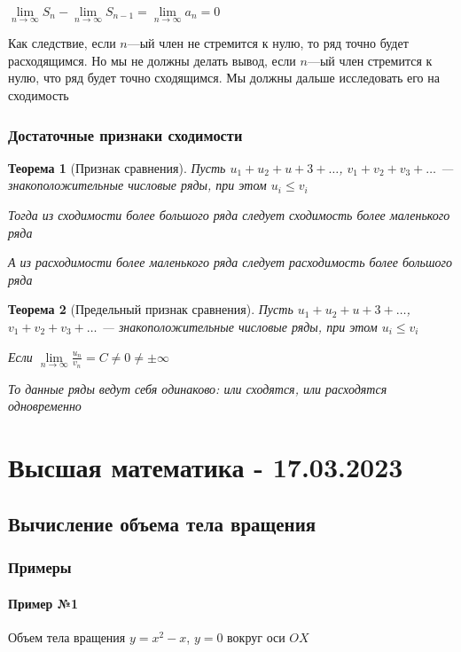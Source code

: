 \documentclass{article}
\newtheorem{theorem}{Теорема}
\begin{document}
$\lim\limits_{n \to \infty} S_{n} - \lim\limits_{n \to \infty} S_{n - 1} = \lim\limits_{n \to \infty} a_n = 0$

\hfill

Как следствие, если $n$—ый член не стремится к нулю, то ряд точно будет расходящимся. Но мы не должны делать вывод, если $n$—ый член стремится к нулю, что ряд будет точно сходящимся. Мы должны дальше исследовать его на сходимость

\subsubsection{Достаточные признаки сходимости}

\begin{theorem}[Признак сравнения]
    Пусть $u_1 + u_2 + u+3 + \dots$, $v_1 + v_2 + v_3 + \dots$ — знакоположительные числовые ряды, при этом $u_{i} \le v_{i}$

    Тогда из сходимости более большого ряда следует сходимость более маленького ряда

    А из расходимости более маленького ряда следует расходимость более большого ряда
\end{theorem}

\begin{theorem}[Предельный признак сравнения]
    Пусть $u_1 + u_2 + u+3 + \dots$, $v_1 + v_2 + v_3 + \dots$ — знакоположительные числовые ряды, при этом $u_{i} \le v_{i}$

    Если $\lim\limits_{n \to \infty} \frac{u_{n}}{v_{n}} = C \ne 0 \ne \pm \infty$

    То данные ряды ведут себя одинаково: или сходятся, или расходятся одновременно
\end{theorem}

\pagebreak
\section{Высшая математика - 17.03.2023}

\subsection{Вычисление объема тела вращения}

\subsubsection{Примеры}

\paragraph{Пример №1} Объем тела вращения $y = x^2 - x$, $y = 0$ вокруг оси $OX$
\end{document}
